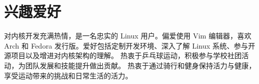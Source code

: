 \section{兴趣爱好}
  \resumeSubHeadingListStart
      {对内核开发充满热情，是一名忠实的 Linux 用户。偏爱使用 Vim 编辑器，喜欢 Arch 和 Fedora 发行版。爱好包括定制开发环境、深入了解 Linux 系统、参与开源项目以及增进对内核架构的理解。}
      {热衷于乒乓球运动，积极参与学校社团活动，为团队发展和技能提升做出贡献。}
      {热衷于通过骑行和健身保持活力与健康，享受运动带来的挑战和日常生活的活力。}
  \resumeSubHeadingListEnd